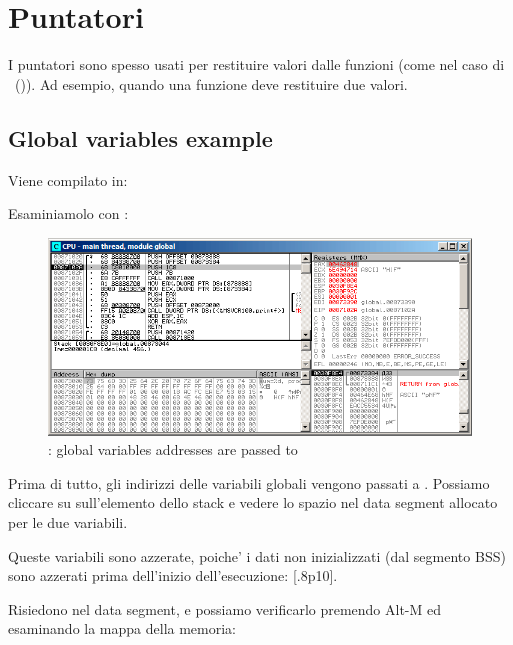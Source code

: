 \chapter{Puntatori}
\myindex{\CLanguageElements!\Pointers}
\label{label_pointers}

I puntatori sono spesso usati per restituire valori dalle funzioni (come nel caso di \scanf ~()).
Ad esempio, quando una funzione deve restituire due valori.

\section{Global variables example}



Viene compilato in:



\myindex{\olly}
\clearpage
Esaminiamolo con \olly:

\begin{figure}[H]
\centering
\includegraphics[scale=\FigScale]{patterns/061_pointers/olly_global1.png}
\caption{\olly: 
global variables addresses are passed to \ttfone}
\label{fig:pointers_olly_global_1}
\end{figure}

Prima di tutto, gli indirizzi delle variabili globali vengono passati a \ttfone.
Possiamo cliccare su  sull'elemento dello stack e vedere lo spazio nel data segment allocato per le due variabili.

\clearpage
Queste variabili sono azzerate, poiche' i dati non inizializzati (dal segmento \ac{BSS}) sono azzerati prima dell'inizio dell'esecuzione: [.8p10].

Risiedono nel data segment, e possiamo verificarlo premendo Alt-M ed esaminando la mappa della memoria:

